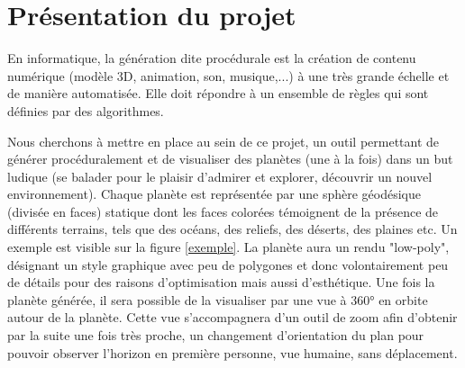 \documentclass[a4paper]{article}
\begin{document}
\begin{titlepage}






\vfill %

\end{titlepage}

\newpage

\tableofcontents

\newpage

\section{Présentation du projet}

En informatique, la génération dite procédurale est la création de contenu numérique (modèle 3D, animation, son, musique,...) à une très grande échelle et de manière automatisée. Elle doit répondre à un ensemble de règles qui sont définies par des algorithmes.\\
\par
Nous cherchons à mettre en place au sein de ce projet, un outil permettant de générer procéduralement et de visualiser des planètes (une à la fois) dans un but ludique (se balader pour le plaisir d'admirer et explorer, découvrir un nouvel environnement). Chaque planète est représentée par une sphère géodésique (divisée en faces) statique dont les faces colorées témoignent de la présence de différents terrains, tels que des océans, des reliefs, des déserts, des plaines etc. Un exemple est visible sur la figure \ref{exemple}. La planète aura un rendu "low-poly", désignant un style graphique avec peu de polygones et donc volontairement peu de détails pour des raisons d'optimisation mais aussi d'esthétique. Une fois la planète générée, il sera possible de la visualiser par une vue à 360° en orbite autour de la planète. Cette vue s'accompagnera d'un outil de zoom afin d'obtenir par la suite une fois très proche, un changement d'orientation du plan pour pouvoir observer l'horizon en première personne, vue humaine, sans déplacement.
\end{document}
